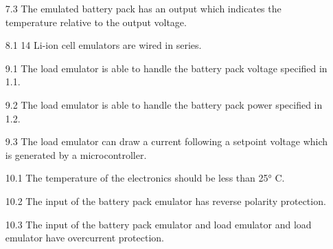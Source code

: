 \begin{enumerate}
    \item[7.3] The emulated battery pack has an output which indicates the
    temperature relative to the output voltage.
    \item[8.1] 14 Li-ion cell emulators are wired in series. 
    \item[9.1] The load emulator is able to handle the battery pack voltage
    specified in 1.1.
    \item[9.2] The load emulator is able to handle the battery pack power
    specified in 1.2.
    \item[9.3] The load emulator can draw a current following a setpoint 
    voltage which is generated by a microcontroller.
    \item[10.1] The temperature of the electronics should be less than 25° C.
    \item[10.2] The input of the battery pack emulator has reverse polarity
    protection.
    \item[10.3] The input of the battery pack emulator and load emulator and
    load emulator have overcurrent protection.  
\end{enumerate}